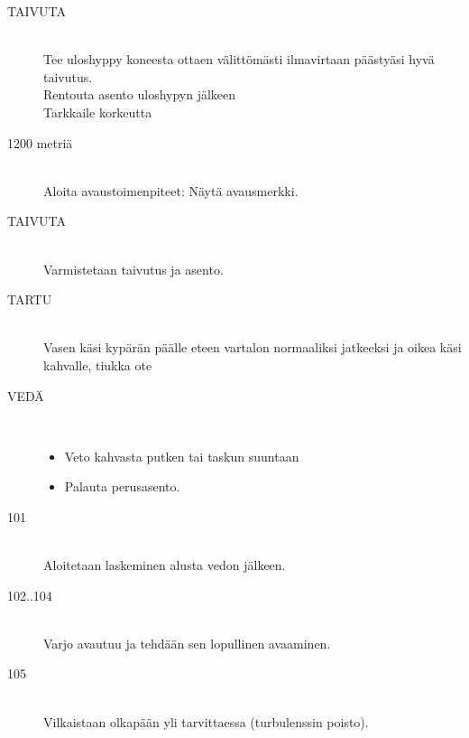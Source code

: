 \begin{description}
\item[TAIVUTA] \hfill \\ 
Tee uloshyppy koneesta ottaen välittömästi ilmavirtaan päästyäsi hyvä taivutus. \hfill \\ 
Rentouta asento uloshypyn jälkeen \hfill \\ 
Tarkkaile korkeutta \hfill \\ 
\item[1200 metriä] \hfill \\ 
Aloita avaustoimenpiteet: Näytä avausmerkki. \hfill \\ 
\item[TAIVUTA ] \hfill \\ 
Varmistetaan taivutus ja asento. \hfill \\ 
\item[TARTU] \hfill \\ 
Vasen käsi kypärän päälle eteen vartalon normaaliksi jatkeeksi ja oikea käsi kahvalle, tiukka ote \hfill \\ 
\item[VEDÄ] \hfill \\ 
	\begin{itemize}
	\item  Veto kahvasta putken tai taskun suuntaan 
	\item  Palauta perusasento. 
	\end{itemize}
\item[101 ] \hfill \\ 
Aloitetaan laskeminen alusta vedon jälkeen. \hfill \\ 
\item[102..104 ] \hfill \\ 
Varjo avautuu ja tehdään sen lopullinen avaaminen. \hfill \\ 
\item[105 ] \hfill \\ 
Vilkaistaan olkapään yli tarvittaessa (turbulenssin poisto). \hfill \\ 
\end{description}

